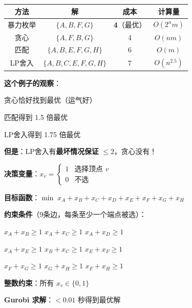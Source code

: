 \documentclass[12pt, a4paper]{ctexart}
\begin{document}
\begin{blackboard}

\begin{center}
\begin{tabular}{c|c|c|c}
方法 & 解 & 成本 & 计算量 \\
\hline
暴力枚举 & $\{A, B, F, G\}$ & \textbf{4}（最优） & $O(2^n m)$ \\
贪心 & $\{A, F, B, G\}$ & 4 & $O(nm)$ \\
匹配 & $\{A, B, E, F, G, H\}$ & 6 & $O(m)$ \\
LP舍入 & $\{A, B, C, E, F, G, H\}$ & 7 & $O(n^{2.5})$
\end{tabular}
\end{center}

\textbf{这个例子的观察}：

贪心恰好找到最优（运气好）

匹配得到 1.5 倍最优

LP舍入得到 1.75 倍最优

\textbf{但是}：LP舍入有\textbf{最坏情况保证} $\leq 2$，贪心没有！

\end{blackboard}

\begin{blackboard}

\textbf{决策变量}：$x_v = \begin{cases} 1 & \text{选择顶点 } v \\ 0 & \text{不选} \end{cases}$

\textbf{目标函数}：$\min \; x_A + x_B + x_C + x_D + x_E + x_F + x_G + x_H$

\textbf{约束条件}（9条边，每条至少一个端点被选）：

$x_A + x_B \geq 1$ \quad $x_A + x_C \geq 1$ \quad $x_A + x_D \geq 1$

$x_A + x_E \geq 1$ \quad $x_B + x_C \geq 1$ \quad $x_E + x_F \geq 1$

$x_F + x_G \geq 1$ \quad $x_G + x_H \geq 1$ \quad $x_F + x_H \geq 1$

\textbf{整数约束}：所有 $x_v \in \{0, 1\}$

\textbf{Gurobi 求解}：$< 0.01$ 秒得到最优解

\end{blackboard}
\end{document}
